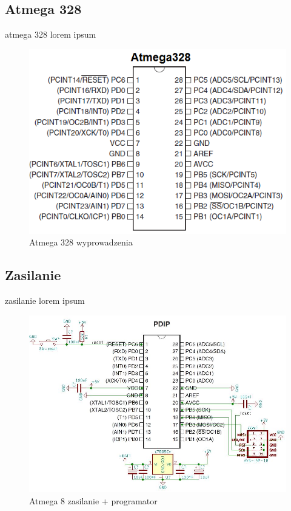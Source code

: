 \documentclass{article}
\begin{document}
\subsection{Atmega 328}
atmega 328 lorem ipsum

\begin{figure}[H]
	\center
	\includegraphics[scale=0.7]{img/Atmega328-pinout.png}
	\caption{Atmega 328 wyprowadzenia}
	\label{fig:img2}
\end{figure}


\subsection{Zasilanie}
zasilanie lorem ipsum

\begin{figure}[H]
	\center
	\includegraphics[width=\textwidth]{img/atmega-zasilanie.jpg}
	\caption{Atmega 8 zasilanie + programator}
	\label{fig:img3}
\end{figure}
\end{document}
